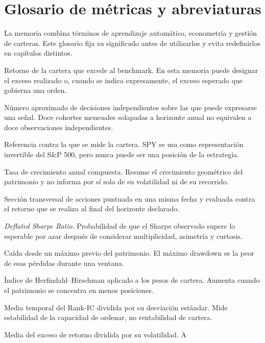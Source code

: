 \chapter*{Glosario de métricas y abreviaturas}

La memoria combina términos de aprendizaje automático, econometría y gestión de carteras. Este
glosario fija su significado antes de utilizarlos y evita redefinirlos en capítulos distintos.

\begin{description}[leftmargin=3.2cm,style=nextline,itemsep=0.45em]
  \item[Alfa] Retorno de la cartera que excede al benchmark. En esta memoria puede designar el
  exceso realizado o, cuando se indica expresamente, el exceso esperado que gobierna una orden.
  \item[Amplitud] Número aproximado de decisiones independientes sobre las que puede expresarse una
  señal. Doce cohortes mensuales solapadas a horizonte anual no equivalen a doce observaciones
  independientes.
  \item[Benchmark] Referencia contra la que se mide la cartera. SPY se usa como representación
  invertible del S\&P 500, pero nunca puede ser una posición de la estrategia.
  \item[CAGR] Tasa de crecimiento anual compuesta. Resume el crecimiento geométrico del patrimonio
  y no informa por sí sola de su volatilidad ni de su recorrido.
  \item[Cohorte] Sección transversal de acciones puntuada en una misma fecha y evaluada contra el
  retorno que se realiza al final del horizonte declarado.
  \item[DSR] \textit{Deflated Sharpe Ratio}. Probabilidad de que el Sharpe observado supere lo
  esperable por azar después de considerar multiplicidad, asimetría y curtosis.
  \item[Drawdown] Caída desde un máximo previo del patrimonio. El máximo drawdown es la peor de esas
  pérdidas durante una ventana.
  \item[HHI] Índice de Herfindahl--Hirschman aplicado a los pesos de cartera. Aumenta cuando el
  patrimonio se concentra en menos posiciones.
  \item[IC-IR] Media temporal del Rank-IC dividida por su desviación estándar. Mide estabilidad de
  la capacidad de ordenar, no rentabilidad de cartera.
  \item[Information Ratio (IR)] Media del exceso de retorno dividida por su volatilidad. A

\end{description}
